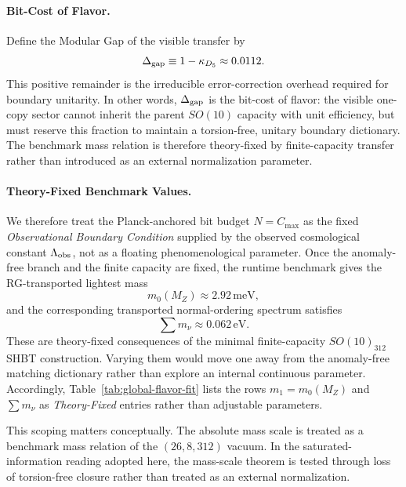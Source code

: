\documentclass[11pt]{article}
\begin{document}
\paragraph{Bit-Cost of Flavor.}
Define the Modular Gap of the visible transfer by
\begin{equation}
 \Delta_{\rm gap}\equiv 1-\kappa_{D_5}\approx 0.0112.
\end{equation}
This positive remainder is the irreducible error-correction overhead required for boundary unitarity. In other words, $\Delta_{\rm gap}$ is the bit-cost of flavor: the visible one-copy sector cannot inherit the parent $SO(10)$ capacity with unit efficiency, but must reserve this fraction to maintain a torsion-free, unitary boundary dictionary. The benchmark mass relation is therefore theory-fixed by finite-capacity transfer rather than introduced as an external normalization parameter.

\paragraph{Theory-Fixed Benchmark Values.}
We therefore treat the Planck-anchored bit budget $N=C_{\max}$ as the fixed \emph{Observational Boundary Condition} supplied by the observed cosmological constant $\Lambda_{\rm obs}$, not as a floating phenomenological parameter. Once the anomaly-free branch and the finite capacity are fixed, the runtime benchmark gives the RG-transported lightest mass
\begin{equation}
 m_0(M_Z)\approx 2.92\,\mathrm{meV},
\end{equation}
and the corresponding transported normal-ordering spectrum satisfies
\begin{equation}
 \sum m_\nu\approx 0.062\,\mathrm{eV}.
\end{equation}
These are theory-fixed consequences of the minimal finite-capacity $SO(10)_{312}$ SHBT construction. Varying them would move one away from the anomaly-free matching dictionary rather than explore an internal continuous parameter.
Accordingly, Table~\ref{tab:global-flavor-fit} lists the rows $m_1=m_0(M_Z)$ and $\sum m_\nu$ as \emph{Theory-Fixed} entries rather than adjustable parameters.

This scoping matters conceptually. The absolute mass scale is treated as a benchmark mass relation of the $(26,8,312)$ vacuum. In the saturated-information reading adopted here, the mass-scale theorem is tested through loss of torsion-free closure rather than treated as an external normalization.
\end{document}
